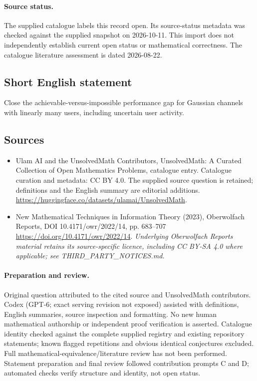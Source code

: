 \documentclass[11pt]{article}
\begin{document}
\paragraph{Source status.}
The supplied catalogue labels this record open. Its source-status metadata was checked against the supplied snapshot on 2026-10-11. This import does not independently establish current open status or mathematical correctness. The catalogue literature assessment is dated 2026-08-22.
\subsection{Short English statement}
Close the achievable-versus-impossible performance gap for Gaussian channels with linearly many users, including uncertain user activity.
\subsection{Sources}
\begin{itemize}
\item[S1] Ulam AI and the UnsolvedMath Contributors, UnsolvedMath: A Curated Collection of Open Mathematics Problems, catalogue entry. Catalogue curation and metadata: CC BY 4.0. The supplied source question is retained; definitions and the English summary are editorial additions.
\url{https://huggingface.co/datasets/ulamai/UnsolvedMath}.
\item[S2] New Mathematical Techniques in Information Theory (2023), Oberwolfach Reports, DOI 10.4171/owr/2022/14, pp. 683--707
\url{https://doi.org/10.4171/owr/2022/14}.
\textit{Underlying Oberwolfach Reports material retains its source-specific licence, including CC BY-SA 4.0 where applicable; see THIRD\_PARTY\_NOTICES.md.}
\end{itemize}
\paragraph{Preparation and review.}
Original question attributed to the cited source and UnsolvedMath contributors. Codex (GPT-6; exact serving revision not exposed) assisted with definitions, English summaries, source inspection and formatting. No new human mathematical authorship or independent proof verification is asserted. Catalogue identity checked against the complete supplied registry and existing repository statements; known flagged repetitions and obvious identical conjectures excluded. Full mathematical-equivalence/literature review has not been performed. Statement preparation and final review followed contribution prompts C and D; automated checks verify structure and identity, not open status.
\label{end:statement}
\end{document}
